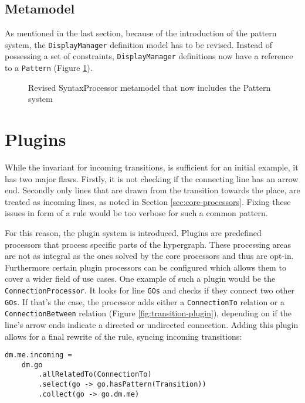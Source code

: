 \subsection{Metamodel}
As mentioned in the last section, because of the introduction of the pattern system, the \texttt{DisplayManager} definition model has to be revised. Instead of possessing a set of constraints, \texttt{DisplayManager} definitions now have a reference to a \texttt{Pattern} (Figure \ref{fig:revised-syntax-model}).

\begin{figure}
  \centering
  
  \caption{Revised SyntaxProcessor metamodel that now includes the Pattern system}
  \label{fig:revised-syntax-model}
\end{figure}


\section{Plugins}
\label{sec:plugins}
While the invariant for incoming transitions, is sufficient for an initial example, it has two major flaws. Firstly, it is not checking if the connecting line has an arrow end. Secondly only lines that are drawn from the transition towards the place, are treated as incoming lines, as noted in Section \ref{sec:core-processors}. Fixing these issues in form of a rule would be too verbose for such a common pattern.

For this reason, the plugin system is introduced. Plugins are predefined processors that process specific parts of the hypergraph. These processing areas are not as integral as the ones solved by the core processors and thus are opt-in. Furthermore certain plugin processors can be configured which allows them to cover a wider field of use cases. One example of such a plugin would be the \texttt{ConnectionProcessor}. It looks for line \texttt{GOs} and checks if they connect two other \texttt{GOs}. If that's the case, the processor adds either a \texttt{ConnectionTo} relation or a \texttt{ConnectionBetween} relation (Figure \ref{fig:transition-plugin}), depending on if the line's arrow ends indicate a directed or undirected connection. Adding this plugin allows for a final rewrite of the rule, syncing incoming transitions:

\begin{lstlisting}[captionpos=b,caption={Final iteration of the place incoming transition rule}]
dm.me.incoming = 
    dm.go
        .allRelatedTo(ConnectionTo)
        .select(go -> go.hasPattern(Transition))
        .collect(go -> go.dm.me)
\end{lstlisting}

